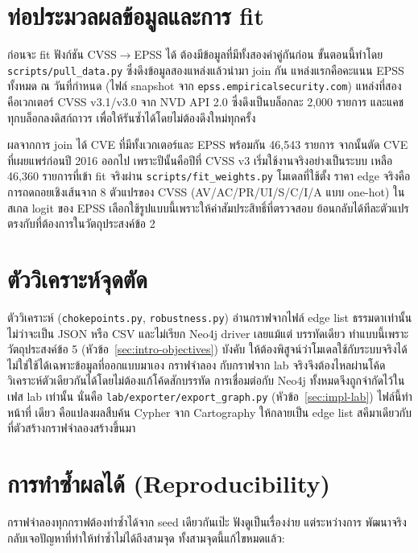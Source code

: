 \section{ท่อประมวลผลข้อมูลและการ fit}\label{sec:impl-pipeline}

ก่อนจะ fit ฟังก์ชัน CVSS$\to$EPSS ได้ ต้องมีข้อมูลที่มีทั้งสองค่าคู่กันก่อน ขั้นตอนนี้ทำโดย
\texttt{scripts/pull\_data.py} ซึ่งดึงข้อมูลสองแหล่งแล้วนำมา join กัน แหล่งแรกคือคะแนน
EPSS ทั้งหมด ณ วันที่กำหนด (ไฟล์ snapshot จาก \texttt{epss.empiricalsecurity.com})
แหล่งที่สองคือเวกเตอร์ CVSS v3.1/v3.0 จาก NVD API 2.0 ซึ่งดึงเป็นบล็อกละ 2{,}000
รายการ และแคชทุกบล็อกลงดิสก์ถาวร เพื่อให้รันซ้ำได้โดยไม่ต้องดึงใหม่ทุกครั้ง

ผลจากการ join ได้ CVE ที่มีทั้งเวกเตอร์และ EPSS พร้อมกัน 46{,}543 รายการ จากนั้นตัด
CVE ที่เผยแพร่ก่อนปี 2016 ออกไป เพราะปีนั้นคือปีที่ CVSS v3 เริ่มใช้งานจริงอย่างเป็นระบบ
เหลือ 46{,}360 รายการที่เข้า fit จริงผ่าน \texttt{scripts/fit\_weights.py} โมเดลที่ใช้ตั้ง
ราคา edge จริงคือการถดถอยเชิงเส้นจาก 8 ตัวแปรของ CVSS (AV/AC/PR/UI/S/C/I/A
แบบ one-hot) ในสเกล logit ของ EPSS เลือกใช้รูปแบบนี้เพราะให้ค่าสัมประสิทธิ์ที่ตรวจสอบ
ย้อนกลับได้ทีละตัวแปร ตรงกับที่ต้องการในวัตถุประสงค์ข้อ 2

\section{ตัววิเคราะห์จุดตัด}\label{sec:impl-analyzer}

ตัววิเคราะห์ (\texttt{chokepoints.py}, \texttt{robustness.py}) อ่านกราฟจากไฟล์ edge
list ธรรมดาเท่านั้น ไม่ว่าจะเป็น JSON หรือ CSV และไม่เรียก Neo4j driver เลยแม้แต่
บรรทัดเดียว ทำแบบนี้เพราะวัตถุประสงค์ข้อ 5 (หัวข้อ~\ref{sec:intro-objectives}) บังคับ
ให้ต้องพิสูจน์ว่าโมเดลใช้กับระบบจริงได้ ไม่ใช่ใช้ได้เฉพาะข้อมูลที่ออกแบบมาเอง กราฟจำลอง
กับกราฟจาก lab จริงจึงต้องไหลผ่านโค้ดวิเคราะห์ตัวเดียวกันได้โดยไม่ต้องแก้โค้ดสักบรรทัด
การเชื่อมต่อกับ Neo4j ทั้งหมดจึงถูกจำกัดไว้ในเฟส lab เท่านั้น นั่นคือ
\texttt{lab/exporter/export\_graph.py} (หัวข้อ~\ref{sec:impl-lab}) ไฟล์นี้ทำหน้าที่
เดียว คือแปลงผลสืบค้น Cypher จาก Cartography ให้กลายเป็น edge list สคีมาเดียวกับ
ที่ตัวสร้างกราฟจำลองสร้างขึ้นมา

\section{การทำซ้ำผลได้ (Reproducibility)}\label{sec:impl-repro}

กราฟจำลองทุกกราฟต้องทำซ้ำได้จาก seed เดียวกันเป๊ะ ฟังดูเป็นเรื่องง่าย แต่ระหว่างการ
พัฒนาจริงกลับเจอปัญหาที่ทำให้ทำซ้ำไม่ได้ถึงสามจุด ทั้งสามจุดนี้แก้ไขหมดแล้ว:

